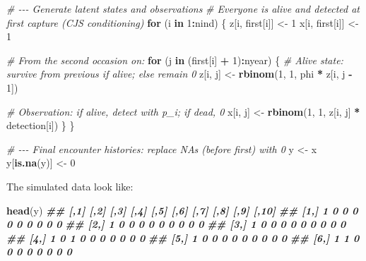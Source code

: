 \documentclass[
  12pt,
]{krantz}
\newenvironment{Shaded}{\begin{snugshade}}{\end{snugshade}}
\newcommand{\CommentTok}[1]{\textcolor[rgb]{0.56,0.35,0.01}{\textit{#1}}}
\newcommand{\ControlFlowTok}[1]{\textcolor[rgb]{0.13,0.29,0.53}{\textbf{#1}}}
\newcommand{\DecValTok}[1]{\textcolor[rgb]{0.00,0.00,0.81}{#1}}
\newcommand{\DocumentationTok}[1]{\textcolor[rgb]{0.56,0.35,0.01}{\textbf{\textit{#1}}}}
\newcommand{\FunctionTok}[1]{\textcolor[rgb]{0.13,0.29,0.53}{\textbf{#1}}}
\newcommand{\NormalTok}[1]{#1}
\newcommand{\OtherTok}[1]{\textcolor[rgb]{0.56,0.35,0.01}{#1}}
\newcommand{\SpecialCharTok}[1]{\textcolor[rgb]{0.81,0.36,0.00}{\textbf{#1}}}
\begin{document}
\begin{Shaded}
\begin{Highlighting}[]
\CommentTok{\# {-}{-}{-} Generate latent states and observations}
\CommentTok{\# Everyone is alive and detected at first capture (CJS conditioning)}
\ControlFlowTok{for}\NormalTok{ (i }\ControlFlowTok{in} \DecValTok{1}\SpecialCharTok{:}\NormalTok{nind) \{}
\NormalTok{  z[i, first[i]] }\OtherTok{\textless{}{-}} \DecValTok{1}
\NormalTok{  x[i, first[i]] }\OtherTok{\textless{}{-}} \DecValTok{1}

  \CommentTok{\# From the second occasion on:}
  \ControlFlowTok{for}\NormalTok{ (j }\ControlFlowTok{in}\NormalTok{ (first[i] }\SpecialCharTok{+} \DecValTok{1}\NormalTok{)}\SpecialCharTok{:}\NormalTok{nyear) \{}
    \CommentTok{\# Alive state: survive from previous if alive; else remain 0}
\NormalTok{    z[i, j] }\OtherTok{\textless{}{-}} \FunctionTok{rbinom}\NormalTok{(}\DecValTok{1}\NormalTok{, }\DecValTok{1}\NormalTok{, phi }\SpecialCharTok{*}\NormalTok{ z[i, j }\SpecialCharTok{{-}} \DecValTok{1}\NormalTok{])}

    \CommentTok{\# Observation: if alive, detect with p\_i; if dead, 0}
\NormalTok{    x[i, j] }\OtherTok{\textless{}{-}} \FunctionTok{rbinom}\NormalTok{(}\DecValTok{1}\NormalTok{, }\DecValTok{1}\NormalTok{, z[i, j] }\SpecialCharTok{*}\NormalTok{ detection[i])}
\NormalTok{  \}}
\NormalTok{\}}

\CommentTok{\# {-}{-}{-} Final encounter histories: replace NAs (before first) with 0}
\NormalTok{y }\OtherTok{\textless{}{-}}\NormalTok{ x}
\NormalTok{y[}\FunctionTok{is.na}\NormalTok{(y)] }\OtherTok{\textless{}{-}} \DecValTok{0}
\end{Highlighting}
\end{Shaded}

The simulated data look like:

\begin{Shaded}
\begin{Highlighting}[]
\FunctionTok{head}\NormalTok{(y)}
\DocumentationTok{\#\#      [,1] [,2] [,3] [,4] [,5] [,6] [,7] [,8] [,9] [,10]}
\DocumentationTok{\#\# [1,]    1    0    0    0    0    0    0    0    0     0}
\DocumentationTok{\#\# [2,]    1    0    0    0    0    0    0    0    0     0}
\DocumentationTok{\#\# [3,]    1    0    0    0    0    0    0    0    0     0}
\DocumentationTok{\#\# [4,]    1    0    1    0    0    0    0    0    0     0}
\DocumentationTok{\#\# [5,]    1    0    0    0    0    0    0    0    0     0}
\DocumentationTok{\#\# [6,]    1    1    0    0    0    0    0    0    0     0}
\end{Highlighting}
\end{Shaded}
\end{document}
